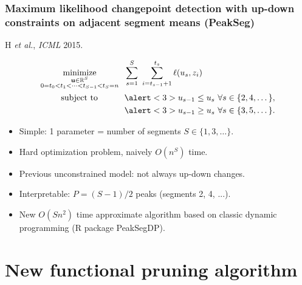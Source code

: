 \documentclass{beamer}
\DeclareMathOperator*{\minimize}{minimize}
\newcommand{\RR}{\mathbb R}
\begin{document}
\begin{frame}
  \frametitle{Maximum likelihood changepoint detection with up-down constraints on adjacent segment means (PeakSeg)}
H {\it et al.}, {\it ICML} 2015. 
    
\vskip -1.4cm
\begin{align*}
    \minimize_{\substack{
  \mathbf u\in\RR^{S}
\\
   0=t_0<t_1<\cdots<t_{S-1}<t_S=n
  }} &\ \ 
    \sum_{s=1}^S\  \sum_{i=t_{s-1}+1}^{t_s} \ell( u_s,  z_i) 
  \label{PeakSegPDPA}
\\
      \text{subject to \hskip 0.75cm} &\ \ \alert<3>{u_{s-1} \leq u_s\ \forall s\in\{2,4,\dots\},}
  \nonumber\\
  &\ \ \alert<3>{u_{s-1} \geq u_s\ \forall s\in\{3,5,\dots\}.}
  \nonumber 
\end{align*}
\vskip -0.4cm
\begin{itemize}  
\item Simple: 1 parameter = number of segments $S\in\{1,3,\dots\}$.
\item Hard optimization problem, naively $O(n^S)$ time.
\item \alert<2>{Previous unconstrained model: not always up-down changes.}
\item \alert<3>{Interpretable: $P=(S-1)/2$ peaks (segments 2, 4, ...).}
\item New $O(Sn^2)$ time approximate algorithm based on classic
  dynamic programming (R package PeakSegDP).
\end{itemize}
\end{frame} 

\section{New functional pruning algorithm}
\end{document}
